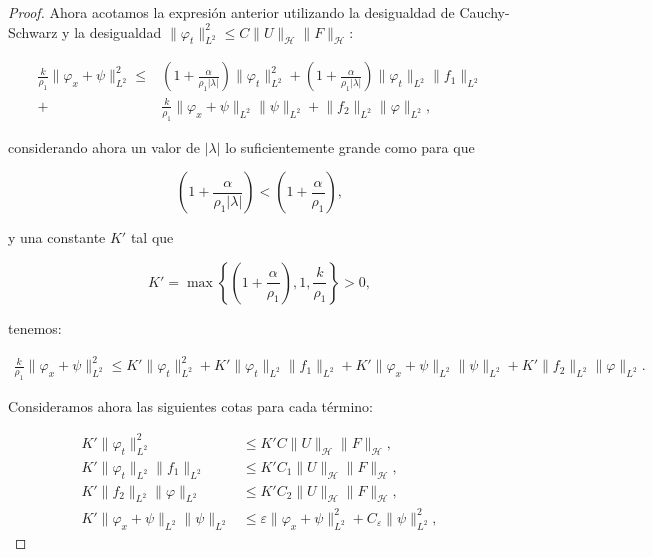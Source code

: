 \begin{proof}
    Ahora acotamos la expresión anterior utilizando la desigualdad de Cauchy-Schwarz y la desigualdad $\lVert \varphi_t \rVert^2_{L^2} \leq C \lVert U \rVert_{\mathcal{H}} \lVert F \rVert_{\mathcal{H}}$:

    \begin{align*}
        \frac{k}{\rho_1}\lVert \varphi_x + \psi \rVert_{L^2}^2 \leq& \left(1 + \frac{\alpha}{\rho_1 \lvert\lambda\lvert}\right) \lVert \varphi_t \rVert_{L^2}^2 + \left( 1 + \frac{\alpha}{\rho_1 \lvert\lambda\lvert}\right)\lVert \varphi_t \rVert_{L^2} \lVert f_1 \rVert_{L^2}\\
        +& \frac{k}{\rho_1} \lVert \varphi_x + \psi\rVert_{L^2} \lVert \psi \rVert_{L^2} + \lVert f_2 \rVert_{L^2} \lVert \varphi \rVert_{L^2},
    \end{align*}

    considerando ahora un valor de $\lvert \lambda \rvert$ lo suficientemente grande como para que 
    
    \[\left(1 + \frac{\alpha}{\rho_1 \lvert\lambda\lvert}\right) < \left(1 + \frac{\alpha}{\rho_1} \right),\]

    y una constante $K'$ tal que

    \[K' = \max \left\{\left(1 + \frac{\alpha}{\rho_1} \right), 1, \frac{k}{\rho_1} \right\} > 0,\]

    tenemos:

    \begin{align*}
        \frac{k}{\rho_1}\lVert \varphi_x + \psi \rVert_{L^2}^2 \leq K'\lVert \varphi_t \rVert_{L^2}^2 + K'\lVert \varphi_t \rVert_{L^2} \lVert f_1 \rVert_{L^2} + K'\lVert \varphi_x + \psi\rVert_{L^2} \lVert \psi \rVert_{L^2} + K'\lVert f_2 \rVert_{L^2} \lVert \varphi \rVert_{L^2}.
    \end{align*}

    Consideramos ahora las siguientes cotas para cada término:

    \begin{align*}
        K'\lVert \varphi_t \rVert_{L^2}^2 &\leq K'C \lVert U \rVert_{\mathcal{H}} \lVert F \rVert_{\mathcal{H}},\\ 
        K'\lVert \varphi_t \rVert_{L^2} \lVert f_1 \rVert_{L^2} &\leq K'C_1 \lVert U \rVert_{\mathcal{H}} \lVert F \rVert_{\mathcal{H}},\\
        K'\lVert f_2 \rVert_{L^2} \lVert \varphi \rVert_{L^2} &\leq K'C_2 \lVert U \rVert_{\mathcal{H}} \lVert F \rVert_{\mathcal{H}},\\
        K'\lVert \varphi_x + \psi\rVert_{L^2} \lVert \psi \rVert_{L^2} &\leq \varepsilon \lVert \varphi_x + \psi\rVert_{L^2}^2 + C_\varepsilon\lVert \psi \rVert_{L^2}^2,
    \end{align*}


\end{proof}
